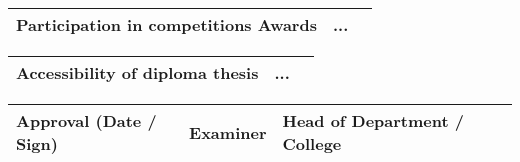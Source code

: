 \vspace{0.5cm}

\begin{tabular}{|p{53mm}|p{110mm}|@{}m{0cm}@{}}
\hline
\vspace{0.05cm}
Participation in \newline competitions \newline Awards & 
\vspace{0.05cm}
...\\ [1.1cm]
\hline
\end{tabular}

\vspace{0.5cm}

\begin{tabular}{|p{53mm}|p{110mm}|@{}m{0cm}@{}}
\hline
\vspace{0.05cm}
Accessibility of \newline diploma thesis & 
\vspace{0.05cm}
...\\ [1.2cm]
\hline
\end{tabular}

\vspace{0.5cm}

\begin{tabular}{|p{5.3cm}|p{5.28cm}|p{5.29cm}|@{}m{0cm}@{}}
\hline
\vspace{-1.1cm}Approval \newline (Date / Sign) & \vspace{-1.1cm} Examiner & \vspace{-1.1cm} Head of Department / \newline College & \\ [1.9cm]
\hline
\end{tabular}